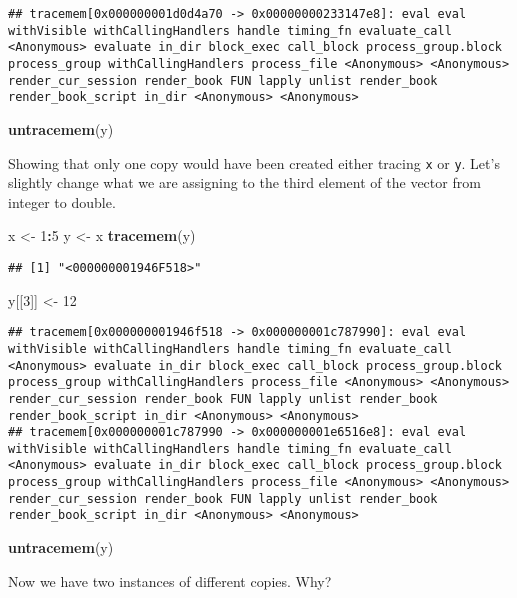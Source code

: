 \documentclass[]{book}
\newenvironment{Shaded}{\begin{snugshade}}{\end{snugshade}}
\newcommand{\DecValTok}[1]{\textcolor[rgb]{0.00,0.00,0.81}{#1}}
\newcommand{\KeywordTok}[1]{\textcolor[rgb]{0.13,0.29,0.53}{\textbf{#1}}}
\newcommand{\NormalTok}[1]{#1}
\newcommand{\OperatorTok}[1]{\textcolor[rgb]{0.81,0.36,0.00}{\textbf{#1}}}
\newcommand{\StringTok}[1]{\textcolor[rgb]{0.31,0.60,0.02}{#1}}
\begin{document}
\begin{verbatim}
## tracemem[0x000000001d0d4a70 -> 0x00000000233147e8]: eval eval withVisible withCallingHandlers handle timing_fn evaluate_call <Anonymous> evaluate in_dir block_exec call_block process_group.block process_group withCallingHandlers process_file <Anonymous> <Anonymous> render_cur_session render_book FUN lapply unlist render_book render_book_script in_dir <Anonymous> <Anonymous>
\end{verbatim}

\begin{Shaded}
\begin{Highlighting}[]
\KeywordTok{untracemem}\NormalTok{(y)}
\end{Highlighting}
\end{Shaded}

Showing that only one copy would have been created either tracing \texttt{x} or \texttt{y}. Let's slightly change what we are assigning to the third element of the vector from integer to double.

\begin{Shaded}
\begin{Highlighting}[]
\NormalTok{x <-}\StringTok{ }\DecValTok{1}\OperatorTok{:}\DecValTok{5}
\NormalTok{y <-}\StringTok{ }\NormalTok{x}
\KeywordTok{tracemem}\NormalTok{(y)}
\end{Highlighting}
\end{Shaded}

\begin{verbatim}
## [1] "<000000001946F518>"
\end{verbatim}

\begin{Shaded}
\begin{Highlighting}[]
\NormalTok{y[[}\DecValTok{3}\NormalTok{]] <-}\StringTok{ }\DecValTok{12}
\end{Highlighting}
\end{Shaded}

\begin{verbatim}
## tracemem[0x000000001946f518 -> 0x000000001c787990]: eval eval withVisible withCallingHandlers handle timing_fn evaluate_call <Anonymous> evaluate in_dir block_exec call_block process_group.block process_group withCallingHandlers process_file <Anonymous> <Anonymous> render_cur_session render_book FUN lapply unlist render_book render_book_script in_dir <Anonymous> <Anonymous> 
## tracemem[0x000000001c787990 -> 0x000000001e6516e8]: eval eval withVisible withCallingHandlers handle timing_fn evaluate_call <Anonymous> evaluate in_dir block_exec call_block process_group.block process_group withCallingHandlers process_file <Anonymous> <Anonymous> render_cur_session render_book FUN lapply unlist render_book render_book_script in_dir <Anonymous> <Anonymous>
\end{verbatim}

\begin{Shaded}
\begin{Highlighting}[]
\KeywordTok{untracemem}\NormalTok{(y)}
\end{Highlighting}
\end{Shaded}

Now we have two instances of different copies. Why?
\end{document}
